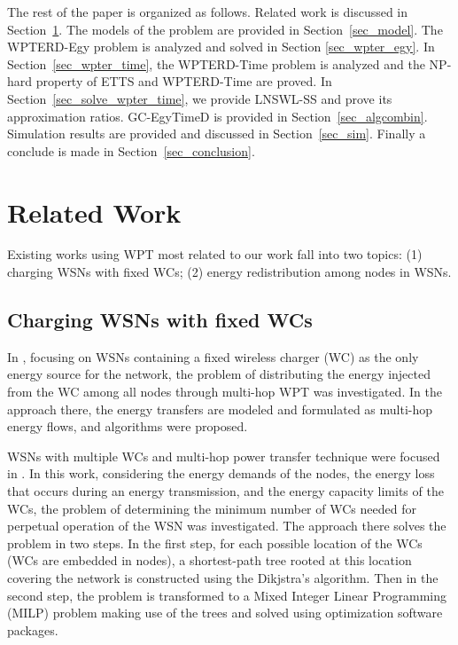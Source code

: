 \documentclass[12pt,journal,onecolumn,draftcls]{IEEEtran}
\begin{document}
The rest of the paper is organized as follows. Related work is discussed in Section~\ref{sec_relwork}. The models of the problem are provided in Section~\ref{sec_model}. The WPTERD-Egy problem is analyzed and solved in Section \ref{sec_wpter_egy}. In Section~\ref{sec_wpter_time}, the WPTERD-Time problem is analyzed and the NP-hard property of ETTS and WPTERD-Time are proved. In Section~\ref{sec_solve_wpter_time}, we provide LNSWL-SS and prove its approximation ratios. GC-EgyTimeD is provided in Section~\ref{sec_algcombin}. Simulation results are provided and discussed in Section~\ref{sec_sim}. Finally a conclude is made in Section~\ref{sec_conclusion}.

\section{Related Work}
\label{sec_relwork}
Existing works using WPT most related to our work fall into two topics: (1) charging WSNs with fixed WCs; (2) energy redistribution among nodes in WSNs.

\subsection{Charging WSNs with fixed WCs}

In \cite{Xiang2013}, focusing on WSNs containing a fixed wireless charger (WC) as the only energy source for the network, the problem of distributing the energy injected from the WC among all nodes through multi-hop WPT was investigated. In the approach there, the energy transfers are modeled and formulated as multi-hop energy flows, and algorithms were proposed.

WSNs with multiple WCs and multi-hop power transfer technique were focused in \cite{Rault2013}. In this work, considering the energy demands of the nodes, the energy loss that occurs during an energy transmission, and the energy capacity limits of the WCs, the problem of determining the minimum number of WCs needed for perpetual operation of the WSN was investigated. The approach there solves the problem in two steps. In the first step, for each possible location of the WCs (WCs are embedded in nodes), a shortest-path tree rooted at this location covering the network is constructed using the Dikjstra's algorithm. Then in the second step, the problem is transformed to a Mixed Integer Linear Programming (MILP) problem making use of the trees and solved using optimization software packages.
\end{document}
